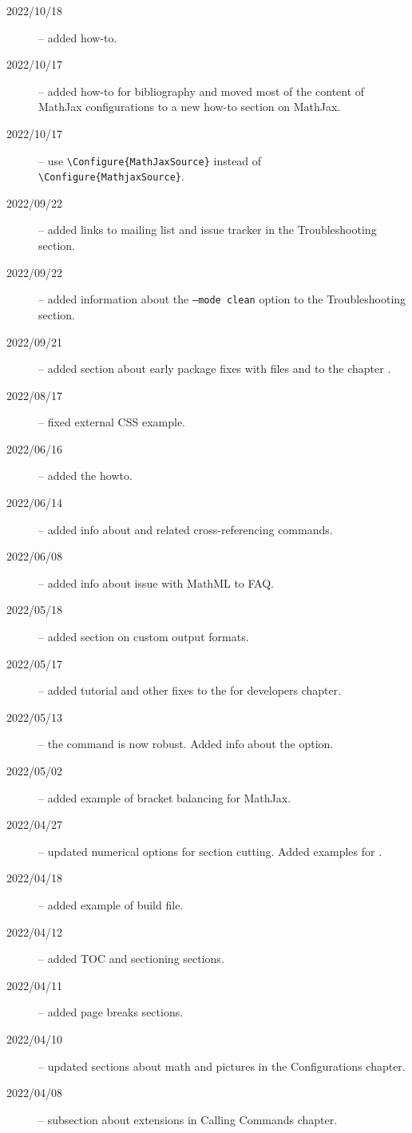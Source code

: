 
\begin{description}
  \item[2022/10/18] -- added  how-to.
  \item[2022/10/17] -- added how-to for bibliography and moved most of the content of MathJax configurations to a new how-to section on MathJax. 
  \item[2022/10/17] -- use \verb|\Configure{MathJaxSource}| instead of \verb|\Configure{MathjaxSource}|.
  \item[2022/09/22] -- added links to mailing list and issue tracker in the Troubleshooting section.
  \item[2022/09/22] -- added information about the \texttt{--mode clean} option to the Troubleshooting section.
  \item[2022/09/21] -- added section about early package fixes with  files and  to the chapter .
  \item[2022/08/17] -- fixed external CSS example.
  \item[2022/06/16] -- added the  howto.
  \item[2022/06/14] -- added info about  and related cross-referencing commands.
  \item[2022/06/08] -- added info about  issue with MathML to FAQ.
  \item[2022/05/18] -- added section on custom output formats.
  \item[2022/05/17] -- added tutorial and other fixes to the for developers chapter.
  \item[2022/05/13] -- the  command is now robust. Added info about the  option.
  \item[2022/05/02] -- added example of bracket balancing for MathJax.
  \item[2022/04/27] -- updated numerical options for section cutting. Added examples for .
  \item[2022/04/18] -- added example of \makefourht{} build file.
  \item[2022/04/12] -- added TOC and sectioning sections.
  \item[2022/04/11] -- added page breaks sections.
  \item[2022/04/10] -- updated sections about math and pictures in the Configurations chapter.
  \item[2022/04/08] -- subsection about \makefourht{} extensions in Calling Commands chapter.

\end{description}
